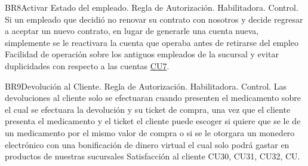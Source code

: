 \begin{BussinesRule}{BR8}{Activar Estado del empleado.}
	\BRitem[Tipo:] Regla de Autorización. 
	\BRitem[Clase:] Habilitadora. 
	\BRitem[Nivel:] Control. %
	\BRitem[Descripción:] Si un empleado que decidió no renovar su contrato con nosotros y decide regresar a aceptar un nuevo contrato, en lugar de generarle una cuenta nueva, simplemente se le reactivara la cuenta que operaba antes de retirarse del empleo
	\BRitem[Motivación:] Facilidad de operación sobre los antiguos empleados de la sucursal y evitar duplicidades con respecto a las cuentas
	 \hyperlink{CU7}{CU7}.
\end{BussinesRule}

\begin{BussinesRule}{BR9}{Devolución al Cliente.}
	\BRitem[Tipo:] Regla de Autorización. 
	\BRitem[Clase:] Habilitadora. 
	\BRitem[Nivel:] Control. %
	\BRitem[Descripción:] Las devoluciones al cliente solo se efectuaran cuando presenten el medicamento sobre el cual se efectuara la devolución y su ticket de compra, una vez que el cliente presenta el medicamento y el ticket el cliente puede escoger si quiere que se le de un medicamento por el mismo valor de compra o si se le otorgara un monedero electrónico con una bonificación de dinero virtual el cual solo podrá gastar en productos de nuestras sucursales 
	\BRitem[Motivación:] Satisfacción al cliente
	 CU30, CU31, CU32, CU.
\end{BussinesRule}

